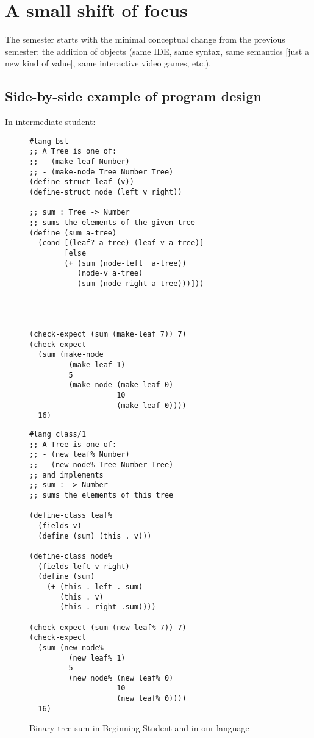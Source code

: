 \documentclass[submission,copyright]{eptcs}
\begin{document}
\section{A small shift of focus}
\label{sec:shift}

The semester starts with the minimal conceptual change from the
previous semester: the addition of objects (same IDE, same syntax,
same semantics [just a new kind of value], same interactive video
games, etc.).

\subsection{Side-by-side example of program design}

In intermediate student:

\begin{figure}
\begin{minipage}[t]{3.5in}
\begin{verbatim}
#lang bsl
;; A Tree is one of:
;; - (make-leaf Number)
;; - (make-node Tree Number Tree)
(define-struct leaf (v))
(define-struct node (left v right))

;; sum : Tree -> Number
;; sums the elements of the given tree
(define (sum a-tree)
  (cond [(leaf? a-tree) (leaf-v a-tree)]
        [else
        (+ (sum (node-left  a-tree))
           (node-v a-tree)
           (sum (node-right a-tree)))]))




(check-expect (sum (make-leaf 7)) 7)
(check-expect 
  (sum (make-node
         (make-leaf 1)
         5 
         (make-node (make-leaf 0)
                    10
                    (make-leaf 0))))
  16)
\end{verbatim}
\end{minipage}
\begin{minipage}[t]{3in}
\begin{verbatim}
#lang class/1
;; A Tree is one of:
;; - (new leaf% Number)
;; - (new node% Tree Number Tree)
;; and implements
;; sum : -> Number
;; sums the elements of this tree

(define-class leaf%
  (fields v)
  (define (sum) (this . v)))

(define-class node%
  (fields left v right)
  (define (sum)
    (+ (this . left . sum)
       (this . v)
       (this . right .sum))))

(check-expect (sum (new leaf% 7)) 7)
(check-expect 
  (sum (new node%
         (new leaf% 1)
         5 
         (new node% (new leaf% 0) 
                    10
                    (new leaf% 0))))
  16)
\end{verbatim}
\end{minipage}
\caption{Binary tree sum in Beginning Student and in our language}
\end{figure}
\end{document}

